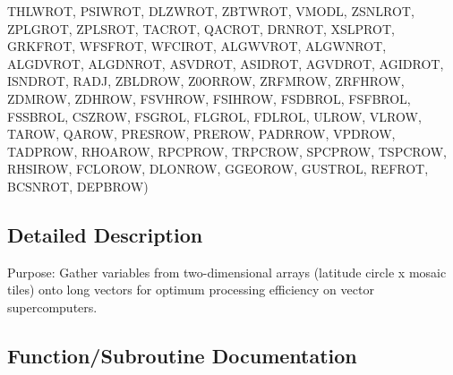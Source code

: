 \begin{DoxyCompactItemize}
T\+H\+L\+W\+R\+O\+T, P\+S\+I\+W\+R\+O\+T, D\+L\+Z\+W\+R\+O\+T, Z\+B\+T\+W\+R\+O\+T, V\+M\+O\+D\+L, Z\+S\+N\+L\+R\+O\+T, Z\+P\+L\+G\+R\+O\+T, Z\+P\+L\+S\+R\+O\+T, T\+A\+C\+R\+O\+T, Q\+A\+C\+R\+O\+T, D\+R\+N\+R\+O\+T, X\+S\+L\+P\+R\+O\+T, G\+R\+K\+F\+R\+O\+T, W\+F\+S\+F\+R\+O\+T, W\+F\+C\+I\+R\+O\+T, A\+L\+G\+W\+V\+R\+O\+T, A\+L\+G\+W\+N\+R\+O\+T, A\+L\+G\+D\+V\+R\+O\+T, A\+L\+G\+D\+N\+R\+O\+T, A\+S\+V\+D\+R\+O\+T, A\+S\+I\+D\+R\+O\+T, A\+G\+V\+D\+R\+O\+T, A\+G\+I\+D\+R\+O\+T, I\+S\+N\+D\+R\+O\+T, R\+A\+D\+J, Z\+B\+L\+D\+R\+O\+W, Z0\+O\+R\+R\+O\+W, Z\+R\+F\+M\+R\+O\+W, Z\+R\+F\+H\+R\+O\+W, Z\+D\+M\+R\+O\+W, Z\+D\+H\+R\+O\+W, F\+S\+V\+H\+R\+O\+W, F\+S\+I\+H\+R\+O\+W, F\+S\+D\+B\+R\+O\+L, F\+S\+F\+B\+R\+O\+L, F\+S\+S\+B\+R\+O\+L, C\+S\+Z\+R\+O\+W, F\+S\+G\+R\+O\+L, F\+L\+G\+R\+O\+L, F\+D\+L\+R\+O\+L, U\+L\+R\+O\+W, V\+L\+R\+O\+W, T\+A\+R\+O\+W, Q\+A\+R\+O\+W, P\+R\+E\+S\+R\+O\+W, P\+R\+E\+R\+O\+W, P\+A\+D\+R\+R\+O\+W, V\+P\+D\+R\+O\+W, T\+A\+D\+P\+R\+O\+W, R\+H\+O\+A\+R\+O\+W, R\+P\+C\+P\+R\+O\+W, T\+R\+P\+C\+R\+O\+W, S\+P\+C\+P\+R\+O\+W, T\+S\+P\+C\+R\+O\+W, R\+H\+S\+I\+R\+O\+W, F\+C\+L\+O\+R\+O\+W, D\+L\+O\+N\+R\+O\+W, G\+G\+E\+O\+R\+O\+W, G\+U\+S\+T\+R\+O\+L, R\+E\+F\+R\+O\+T, B\+C\+S\+N\+R\+O\+T, D\+E\+P\+B\+R\+O\+W)
\end{DoxyCompactItemize}


\subsection{Detailed Description}
Purpose\+: Gather variables from two-\/dimensional arrays (latitude circle x mosaic tiles) onto long vectors for optimum processing efficiency on vector supercomputers. 



\subsection{Function/\+Subroutine Documentation}
\hypertarget{CLASSG_8f_ab216eee141d163cce79e9606e2374659}{}
